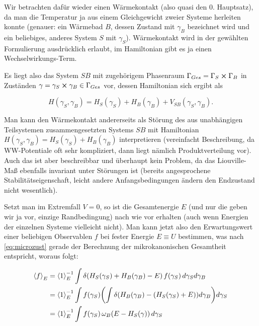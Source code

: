 \documentclass[../KlassMech_main.tex]{subfiles}
\begin{document}
Wir betrachten dafür wieder einen Wärmekontakt (also quasi den 0. Hauptsatz), da man die Temperatur ja aus einem Gleichgewicht zweier Systeme herleiten konnte (genauer: ein Wärmebad $B$, dessen Zustand mit $\gamma_B$ bezeichnet wird und ein beliebiges, anderes System $S$ mit $\gamma_S$). Wärmekontakt wird in der gewählten Formulierung ausdrücklich erlaubt, im Hamiltonian gibt es ja einen Wechselwirkungs-Term.

Es liegt also das System $SB$ mit zugehörigem Phasenraum $\Gamma_{Ges} = \Gamma_S \cross \Gamma_B$ in Zuständen $\gamma = \gamma_S \cross \gamma_B \in \Gamma_{Ges}$ vor, dessen Hamiltonian sich ergibt als

\begin{equation}
H(\gamma_S, \gamma_B) = H_S(\gamma_S) + H_B(\gamma_B) + V_{SB}(\gamma_S, \gamma_B) .
\end{equation}

Man kann den Wärmekontakt andererseits als Störung des aus unabhängigen Teilsystemen zusammengesetzten Systems $SB$ mit Hamiltonian $H(\gamma_S, \gamma_B) = H_S(\gamma_S) + H_B(\gamma_B)$ interpretieren (vereinfacht Beschreibung, da WW-Potentiale oft sehr kompliziert, dann liegt nämlich Produktverteilung vor). Auch das ist aber beschreibbar und überhaupt kein Problem, da das Liouville-Maß ebenfalls invariant unter Störungen ist (bereits angesprochene Stabilitätseigenschaft, leicht andere Anfangsbedingungen ändern den Endzustand nicht wesentlich).

Setzt man im Extremfall $V = 0$, so ist die Gesamtenergie $E$ (und nur die geben wir ja vor, einzige Randbedingung) nach wie vor erhalten (auch wenn Energien der einzelnen Systeme vielleicht nicht). Man kann jetzt also den Erwartungswert einer beliebigen Observablen $f$ bei fester Energie $E \equiv U$ bestimmen, was nach \eqref{eq:microzust} gerade der Berechnung der mikrokanonischen Gesamtheit entspricht, woraus folgt:

\begin{align}
\expval{f}_E &= \expval{1}_E^{-1} \int \delta\qty(H_S(\gamma_S) + H_B(\gamma_B) - E) \, f(\gamma_S) \, d\gamma_S d\gamma_B
\notag\\
&= \expval{1}_E^{-1} \int f(\gamma_S) \qty(\int \delta\qty(H_B(\gamma_B) - (H_S(\gamma_S) + E)) d\gamma_B) d\gamma_S 
\notag\\
&= \expval{1}_E^{-1} \int f(\gamma_S) \, \omega_B\qty(E-H_S(\gamma)) \, d\gamma_S
\end{align}

	\\
\end{document}
